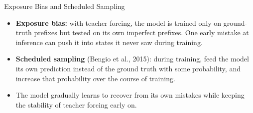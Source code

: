 \begin{frame}{Exposure Bias and Scheduled Sampling}
  \begin{itemize}
    \item \textbf{Exposure bias:} with teacher forcing, the model is trained only on ground-truth prefixes but tested on its own imperfect prefixes. One early mistake at inference can push it into states it never saw during training.
    \item \textbf{Scheduled sampling} (Bengio et al., 2015): during training, feed the model its own prediction instead of the ground truth with some probability, and increase that probability over the course of training.
    \item The model gradually learns to recover from its own mistakes while keeping the stability of teacher forcing early on.
  \end{itemize}
\end{frame}
